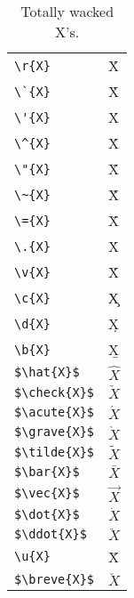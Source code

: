 \documentclass{article}
\begin{document}
\begin{table}
\pagebreak
\begin{center}
\begin{tabular}{ll}
\verb#\r{X}#& \r{X}\\
\verb#\`{X}#& \`{X}\\
\verb#\'{X}#& \'{X}\\
\verb#\^{X}#& \^{X}\\
\verb#\"{X}#& \"{X}\\
\verb#\~{X}#& \~{X}\\
\verb#\={X}#& \={X}\\
\verb#\.{X}#& \.{X}\\
\verb#\v{X}#& \v{X}\\
\verb#\c{X}#& \c{X}\\
\verb#\d{X}#& \d{X}\\
\verb#\b{X}#& \b{X}\\
\verb#$\hat{X}$#& $\hat{X}$\\
\verb#$\check{X}$#& $\check{X}$\\
\verb#$\acute{X}$#& $\acute{X}$\\
\verb#$\grave{X}$#& $\grave{X}$\\
\verb#$\tilde{X}$#& $\tilde{X}$\\
\verb#$\bar{X}$#& $\bar{X}$\\
\verb#$\vec{X}$#& $\vec{X}$\\
\verb#$\dot{X}$#& $\dot{X}$\\
\verb#$\ddot{X}$#& $\ddot{X}$\\
\verb#\u{X}#& \u{X}\\
\verb#$\breve{X}$#& $\breve{X}$
\end{tabular}
\caption{Totally wacked X's.}
\end{center}
\end{table}
\pagebreak
\end{document}
